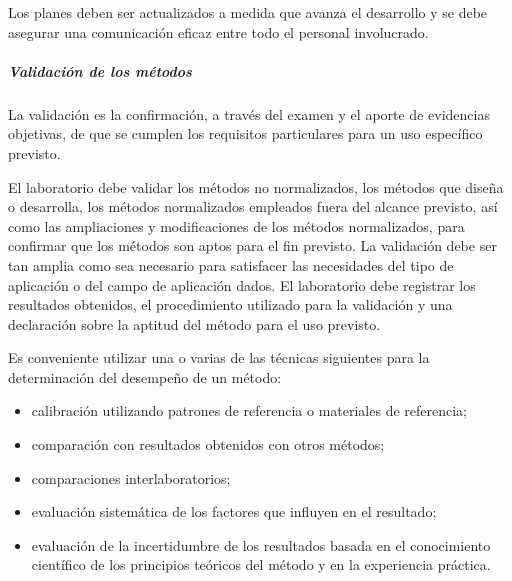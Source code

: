 				\par \noindent
					Los planes deben ser actualizados a medida que avanza el desarrollo y se debe asegurar una comunicación
					eficaz entre todo el personal involucrado.
			
			\subparagraph{Validación de los métodos}
				\par 
					La validación es la confirmación, a través del examen y el aporte de evidencias objetivas, de que
					se cumplen los requisitos particulares para un uso específico previsto.
					
\newpage
\thispagestyle{plain}			
					
				\par \noindent
					El laboratorio debe validar los métodos no normalizados, los métodos que diseña o desarrolla,
					los métodos normalizados empleados fuera del alcance previsto, así como las ampliaciones y modificaciones
					de los métodos normalizados, para confirmar que los métodos son aptos para el fin previsto. La validación
					debe ser tan amplia como sea necesario para satisfacer las necesidades del tipo de aplicación o del campo
					de aplicación dados. El laboratorio debe registrar los resultados obtenidos, el procedimiento utilizado para la
					validación y una declaración sobre la aptitud del método para el uso previsto.
					
				\par \noindent
					Es conveniente utilizar una o varias de las técnicas siguientes para la determinación del desempeño de un
					método:
				
				\begin{itemize}
					\item calibración utilizando patrones de referencia o materiales de referencia;
					
					\item comparación con resultados obtenidos con otros métodos;
					
					\item comparaciones interlaboratorios;
					
					\item evaluación sistemática de los factores que influyen en el resultado;
					
					\item evaluación de la incertidumbre de los resultados basada en el conocimiento científico de los principios teóricos del
					método y en la experiencia práctica.
				\end{itemize} 
				
